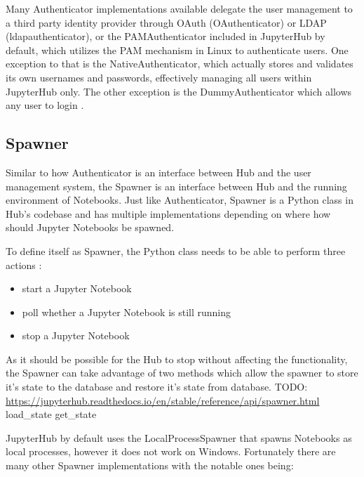 \documentclass[
  digital,     %
  oneside,     %
  nosansbold,  %
  nocolorbold, %
  lof,         %
  lot,         %
]{fithesis4}
\begin{document}
Many Authenticator implementations available delegate the user management to a third party identity provider through OAuth (OAuthenticator) or LDAP (ldapauthenticator), or the PAMAuthenticator included in JupyterHub by default, which utilizes the PAM mechanism in Linux to authenticate users. One exception to that is the NativeAuthenticator, which actually stores and validates its own usernames and passwords, effectively managing all users within JupyterHub only. The other exception is the DummyAuthenticator which allows any user to login \cite{jupyterhub_arch}.


\subsection{Spawner}
Similar to how Authenticator is an interface between Hub and the user management system, the Spawner is an interface between Hub and the running environment of Notebooks. Just like Authenticator, Spawner is a Python class in Hub's codebase and has multiple implementations depending on where how should Jupyter Notebooks be spawned. 

To define itself as Spawner, the Python class needs to be able to perform three actions \cite{jupyterhub_spawner}:

\begin{itemize}
  \item start a Jupyter Notebook
  \item poll whether a Jupyter Notebook is still running
  \item stop a Jupyter Notebook
\end{itemize}

As it should be possible for the Hub to stop without affecting the functionality, the Spawner can take advantage of two methods which allow the spawner to store it's state to the database and restore it's state from database.
TODO: \url{https://jupyterhub.readthedocs.io/en/stable/reference/api/spawner.html} load\_state get\_state

JupyterHub by default uses the LocalProcessSpawner that spawns Notebooks as local processes, however it does not work on Windows. Fortunately there are many other Spawner implementations with the notable ones being:
\end{document}
